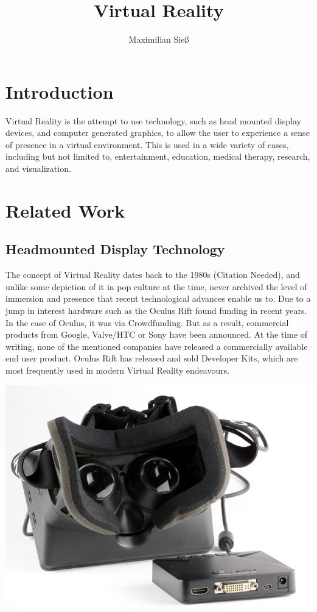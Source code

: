 \documentclass[11pt]{report}
\begin{document}
\title{Virtual Reality}
\author{Maximilian Sieß}
\maketitle

\tableofcontents


\chapter{Introduction}
Virtual Reality is the attempt to use technology, such as head mounted display devices, and computer generated graphics, to allow the user to experience a sense of presence in a virtual environment. This is used in a wide variety of cases, including but not limited to, entertainment, education, medical therapy, research, and visualization.

\chapter{Related Work}
\section{Headmounted Display Technology}
	The concept of Virtual Reality dates back to the 1980s (Citation Needed), and unlike some depiction of it in pop culture at the time, never archived the level of immersion and presence that recent technological advances enable us to. Due to a jump in interest hardware such as the Oculus Rift found funding in recent years. In the case of Oculus, it was via Crowdfunding. But as a result, commercial products from Google, Valve/HTC or Sony have been announced. At the time of writing, none of the mentioned companies have released a commercially available end user product. Oculus Rift has released and sold Developer Kits, which are most frequently used in modern Virtual Reality endeavours.

	\includegraphics[scale=0.3]{or_small}
\end{document}
